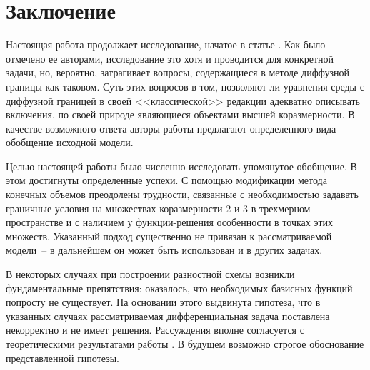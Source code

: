 
\section{Заключение}

Настоящая работа продолжает исследование, начатое в статье \cite{zipunova_higher_codimension}. Как было отмечено ее авторами, исследование это хотя и проводится для конкретной задачи, но, вероятно, затрагивает вопросы, содержащиеся в методе диффузной границы как таковом. Суть этих вопросов в том, позволяют ли уравнения среды с диффузной границей в своей <<классической>> редакции адекватно описывать включения, по своей природе являющиеся объектами высшей коразмерности. В качестве возможного ответа авторы работы \cite{zipunova_higher_codimension} предлагают определенного вида обобщение исходной модели.

Целью настоящей работы было численно исследовать упомянутое обобщение. В этом достигнуты определенные успехи. С помощью модификации метода конечных объемов преодолены трудности, связанные с необходимостью задавать граничные условия на множествах коразмерности 2 и 3 в трехмерном пространстве и с наличием у функции-решения  особенности в точках этих множеств. Указанный подход существенно не привязан к рассматриваемой модели~-- в дальнейшем он может быть использован и в других задачах.

В некоторых случаях при построении разностной схемы возникли фундаментальные препятствия: оказалось, что необходимых базисных функций попросту не существует. На основании этого выдвинута гипотеза, что в указанных случаях рассматриваемая дифференциальная задача поставлена некорректно и не имеет решения. Рассуждения вполне согласуется с теоретическими результатами работы \cite{zipunova_higher_codimension}. В будущем возможно строгое обоснование представленной гипотезы.